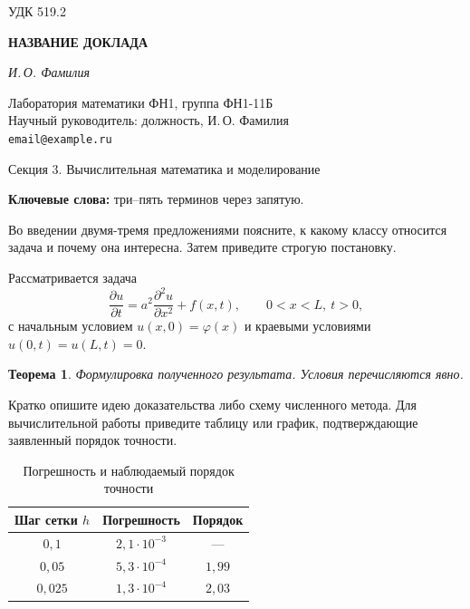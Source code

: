 \documentclass[12pt, a4paper]{article}
\theoremstyle{plain}
\newtheorem{theorem}{Теорема}
\begin{document}
\noindent УДК 519.2

\begin{center}
  {\large\bfseries НАЗВАНИЕ ДОКЛАДА}

  \vspace{0.5em}

  \textit{И.\,О. Фамилия}

  \vspace{0.3em}

  {\small Лаборатория математики ФН1, группа ФН1-11Б\\
  Научный руководитель: должность, И.\,О. Фамилия\\
  \texttt{email@example.ru}}

  \vspace{0.4em}

  {\small Секция 3. Вычислительная математика и моделирование}
\end{center}

\vspace{0.8em}

\noindent\textbf{Ключевые слова:} три--пять терминов через запятую.

\vspace{0.8em}

Во введении двумя-тремя предложениями поясните, к какому классу относится
задача и почему она интересна. Затем приведите строгую постановку.

Рассматривается задача
\begin{equation}\label{eq:main}
  \frac{\partial u}{\partial t} = a^2\frac{\partial^2 u}{\partial x^2} + f(x, t),
  \qquad 0 < x < L,\ t > 0,
\end{equation}
с начальным условием $u(x, 0) = \varphi(x)$ и краевыми условиями
$u(0, t) = u(L, t) = 0$.

\begin{theorem}
  Формулировка полученного результата. Условия перечисляются явно.
\end{theorem}

Кратко опишите идею доказательства либо схему численного метода.
Для вычислительной работы приведите таблицу или график, подтверждающие
заявленный порядок точности.

\begin{table}[h]
  \centering
  \small
  \caption{Погрешность и наблюдаемый порядок точности}
  \begin{tabular}{|c|c|c|}
    \hline
    Шаг сетки $h$ & Погрешность & Порядок \\
    \hline
    $0{,}1$    & $2{,}1\cdot10^{-3}$ & ---      \\
    $0{,}05$   & $5{,}3\cdot10^{-4}$ & $1{,}99$ \\
    $0{,}025$  & $1{,}3\cdot10^{-4}$ & $2{,}03$ \\
    \hline
  \end{tabular}
\end{table}
\end{document}
